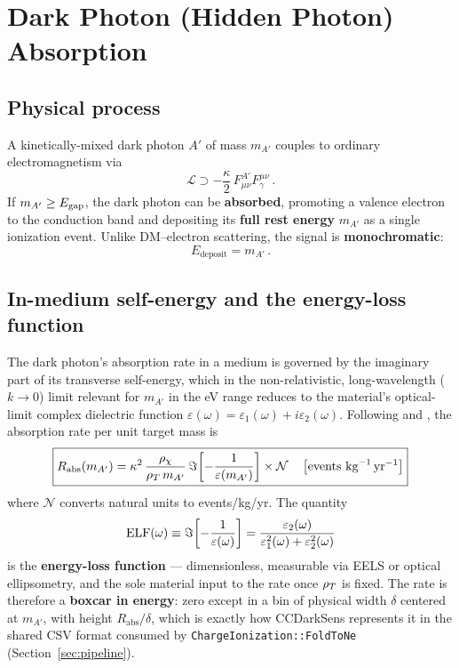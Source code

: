 \section{Dark Photon (Hidden Photon) Absorption}
\label{sec:darkphoton}

\subsection{Physical process}

A kinetically-mixed dark photon $A'$ of mass $m_{A'}$ couples to ordinary
electromagnetism via
\begin{equation}
\mathcal{L} \supset -\frac{\kappa}{2}\,F_{\mu\nu}^{A'}F^{\mu\nu}_\gamma\,.
\end{equation}
If $m_{A'} \geq E_\mathrm{gap}$, the dark photon can be \textbf{absorbed}, promoting
a valence electron to the conduction band and depositing its \textbf{full
rest energy} $m_{A'}$ as a single ionization event. Unlike DM--electron
scattering, the signal is \textbf{monochromatic}:
\begin{equation}
E_\mathrm{deposit} = m_{A'}\,.
\end{equation}

\subsection{In-medium self-energy and the energy-loss function}

The dark photon's absorption rate in a medium is governed by the imaginary
part of its transverse self-energy, which in the non-relativistic,
long-wavelength ($k\to0$) limit relevant for $m_{A'}$ in the eV range
reduces to the material's optical-limit complex dielectric function
$\varepsilon(\omega) = \varepsilon_1(\omega) + i\varepsilon_2(\omega)$.
Following \citet{Hochberg2017} and \citet{Knapen2021}, the absorption rate
per unit target mass is
\begin{equation}
\boxed{
R_\mathrm{abs}(m_{A'}) = \kappa^2\,\frac{\rho_\chi}{\rho_T\, m_{A'}}\,
\Im\!\left[-\frac{1}{\varepsilon(m_{A'})}\right] \times \mathcal{N}
\quad\left[\text{events kg}^{-1}\,\text{yr}^{-1}\right]
}
\label{eq:Rabs}
\end{equation}
where $\mathcal{N}$ converts natural units to events/kg/yr. The quantity
\begin{equation}
\mathrm{ELF}(\omega) \equiv \Im\!\left[-\frac{1}{\varepsilon(\omega)}\right]
= \frac{\varepsilon_2(\omega)}{\varepsilon_1^2(\omega)+\varepsilon_2^2(\omega)}
\end{equation}
is the \textbf{energy-loss function} — dimensionless, measurable via EELS or
optical ellipsometry, and the sole material input to the rate once $\rho_T$
is fixed. The rate is therefore a \textbf{boxcar in energy}: zero except in
a bin of physical width $\delta$ centered at $m_{A'}$, with height
$R_\mathrm{abs}/\delta$, which is exactly how CCDarkSens represents it in
the shared CSV format consumed by \texttt{ChargeIonization::FoldToNe}
(Section~\ref{sec:pipeline}).

